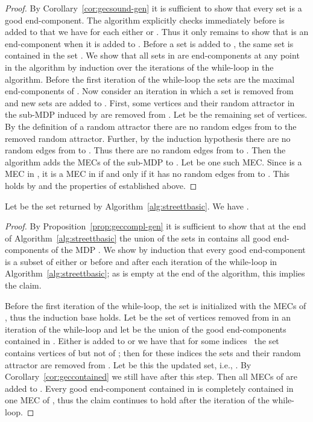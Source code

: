 \documentclass[11pt,letterpaper]{article}
\begin{document}
\begin{proof}
By Corollary~\ref{cor:gecsound-gen} it is sufficient to show that every set 
 is a good end-component. The algorithm explicitly
checks immediately before  is added to  that we have for each 
 either  or . Thus it only remains
to show that  is an end-component when it is added to . Before 
a set is added to , the same set is contained in the set . 
We show that all sets in  are end-components at any point in 
the algorithm by induction over the iterations of the while-loop in the algorithm. 
Before the first iteration of the while-loop the sets  are
the maximal end-components of . Now consider an iteration in which
a set  is removed from  and new sets are added to 
. First, some vertices and their random attractor in the 
sub-MDP  induced by  are removed from . Let  be the 
remaining set of vertices. By the definition of a random attractor there are no 
random edges from  to the removed random attractor. 
Further, by the induction hypothesis there are no random edges from  to . Thus there are no random edges from  to .
Then the algorithm adds the MECs of the sub-MDP  to .
Let  be one such MEC. Since  is a MEC 
in , it is a MEC in  if and only if it has no random edges 
from  to . This holds by  
and the properties of  established above.
\end{proof}

\begin{proposition}\label{prop:basiccompl}
		Let  be the set returned by Algorithm~\ref{alg:streettbasic}.
	We have .
\end{proposition}

\begin{proof}
	By Proposition~\ref{prop:geccompl-gen} it is sufficient to show that at the end of 
	Algorithm~\ref{alg:streettbasic} the union of the sets in  contains
	all good end-components of the MDP . We show by induction that 
	every good end-component is a subset of either 
	 or  before and after each iteration of the while-loop
	in Algorithm~\ref{alg:streettbasic}; as  is empty at the 
	end of the algorithm, this implies the claim.
	
	Before the first iteration of the while-loop, the 
	set  is initialized with the MECs of , thus the induction 
	base holds. Let  be the set of vertices removed from  in 
	an iteration of the while-loop and let  be the union of the 
	good end-components contained in . Either  is added to  or 
	we have that for some indices~ the set  contains vertices of 
	 but not of ; then for these indices the sets  and their 
	random attractor are removed from . 
	Let  be this the updated set, i.e.,  .
	By Corollary~\ref{cor:geccontained} 
	we still have  after this step. Then all 
	MECs of  
	are added to .
	Every good end-component contained in  is completely contained 
	in one MEC of , thus the claim continues to hold after the iteration
	of the while-loop.
\end{proof}
\end{document}
